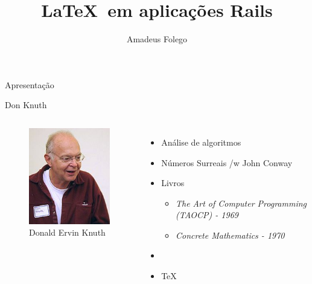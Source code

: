 \documentclass{beamer}
\author{Amadeus Folego}
\title{\LaTeX\ em aplicações Rails}
\date{}
\institute{
  \begin{tabular}{c c}        
    {\em www} & \url{http://badosu.com}\\
    {\em email} & \url{amadeusfolego@gmail.com}
  \end{tabular}
}
\begin{document}
  \begin{frame}[plain] 
    \titlepage
  \end{frame}
  \begin{frame}{Apresentação}
  \end{frame}
  \begin{frame}{Don Knuth}
    \begin{columns}[c]
        \begin{figure}[t]
          \includegraphics[width=\columnwidth]{192px-KnuthAtOpenContentAlliance}
          \caption*{\scriptsize Donald Ervin Knuth}
        \end{figure}
        \begin{itemize}
          \item Análise de algoritmos \pause
          \item Números Surreais /w John Conway \pause
          \item Livros \pause
            \begin{itemize}
              \item {\em The Art of Computer Programming (TAOCP) - 1969} \pause
              \item {\em Concrete Mathematics - 1970} \pause 
            \end{itemize}
          \item \MF\pause
          \item \TeX\ 
        \end{itemize}
    \end{columns}
  \end{frame}
\end{document}
